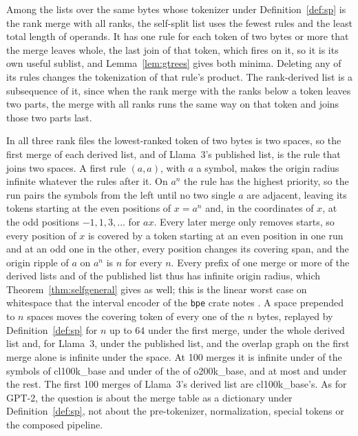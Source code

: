 \documentclass[11pt,a4paper]{article}
\theoremstyle{definition}
\theoremstyle{plain}
\newcommand{\code}[1]{\texttt{#1}}
\begin{document}
Among the lists over the same bytes whose tokenizer under Definition~\ref{def:sp} is the rank merge with all ranks, the
self-split list uses the fewest rules and the least total length of operands. It has one rule for each token of two
bytes or more that the merge leaves whole, the last join of that token, which fires on it, so it is its own useful
sublist, and Lemma~\ref{lem:gtrees} gives both minima. Deleting any of its rules changes the tokenization of that rule's
product. The rank-derived list is a subsequence of it, since when the rank merge with the ranks below a token leaves two
parts, the merge with all ranks runs the same way on that token and joins those two parts last.

In all three rank files the lowest-ranked token of two bytes is two spaces, so the first merge of each derived list, and
of Llama~3's published list, is the rule that joins two spaces. A first rule \((a, a)\), with \(a\) a symbol, makes the
origin radius infinite whatever the rules after it. On \(a^n\) the rule has the highest priority, so the run pairs the
symbols from the left until no two single \(a\) are adjacent, leaving its tokens starting at the even positions of
\(x = a^n\) and, in the coordinates of \(x\), at the odd positions \(-1, 1, 3, \dots\) for \(ax\). Every later merge
only removes starts, so every position of \(x\) is covered by a token starting at an even position in one run and at an
odd one in the other, every position changes its covering span, and the origin ripple of \(a\) on \(a^n\) is \(n\) for
every \(n\). Every prefix of one merge or more of the derived lists and of the published list thus has infinite origin
radius, which Theorem~\ref{thm:selfgeneral} gives as well; this is the linear worst case on whitespace that the interval
encoder of the \code{bpe} crate notes \citep{vanantwerpen2024bpe}. A space prepended to \(n\) spaces moves the covering
token of every one of the \(n\) bytes, replayed by Definition~\ref{def:sp} for \(n\) up to \(64\) under the first merge,
under the whole derived list and, for Llama~3, under the published list, and the overlap graph on the first merge alone
is infinite under the space. At 100 merges it is infinite under \ClInfiniteHundred{} of the \ClSymbolsHundred{} symbols
of cl100k\_base and under \OInfiniteHundred{} of the \OSymbolsHundred{} of o200k\_base, and at most
\ClMaxFiniteHundred{} and \OMaxFiniteHundred{} under the rest. The first 100 merges of Llama~3's derived list are
cl100k\_base's. As for GPT-2, the question is about the merge table as a dictionary under Definition~\ref{def:sp}, not
about the pre-tokenizer, normalization, special tokens or the composed pipeline.
\end{document}

